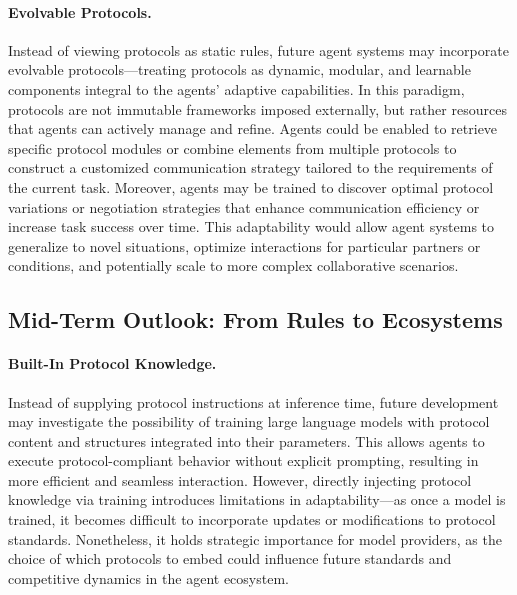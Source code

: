 \documentclass[10pt,preprint]{article}
\begin{document}
\paragraph{Evolvable Protocols.}
Instead of viewing protocols as static rules, future agent systems may incorporate evolvable protocols---treating protocols as dynamic, modular, and learnable components integral to the agents' adaptive capabilities. 
In this paradigm, protocols are not immutable frameworks imposed externally, but rather resources that agents can actively manage and refine. 
Agents could be enabled to retrieve specific protocol modules or combine elements from multiple protocols to construct a customized communication strategy tailored to the requirements of the current task. 
Moreover, agents may be trained to discover optimal protocol variations or negotiation strategies that enhance communication efficiency or increase task success over time. 
This adaptability would allow agent systems to generalize to novel situations, optimize interactions for particular partners or conditions, and potentially scale to more complex collaborative scenarios.

\subsection{Mid-Term Outlook: From Rules to Ecosystems}
\paragraph{Built-In Protocol Knowledge.}
Instead of supplying protocol instructions at inference time, future development may investigate the possibility of training large language models with protocol content and structures integrated into their parameters. 
This allows agents to execute protocol-compliant behavior without explicit prompting, resulting in more efficient and seamless interaction.
However, directly injecting protocol knowledge via training introduces limitations in adaptability---as once a model is trained, it becomes difficult to incorporate updates or modifications to protocol standards. 
Nonetheless, it holds strategic importance for model providers, as the choice of which protocols to embed could influence future standards and competitive dynamics in the agent ecosystem.
\end{document}
